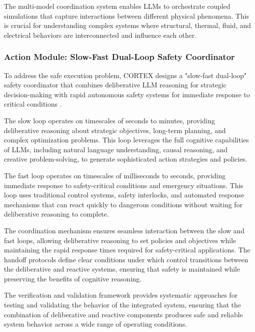 The multi-model coordination system enables LLMs to orchestrate coupled simulations that capture interactions between different physical phenomena. This is crucial for understanding complex systems where structural, thermal, fluid, and electrical behaviors are interconnected and influence each other.

\subsubsection{Action Module: Slow-Fast Dual-Loop Safety Coordinator}

To address the safe execution problem, CORTEX designs a "slow-fast dual-loop" safety coordinator that combines deliberative LLM reasoning for strategic decision-making with rapid autonomous safety systems for immediate response to critical conditions \cite{leveson2011engineering, knight2002safety}.

The slow loop operates on timescales of seconds to minutes, providing deliberative reasoning about strategic objectives, long-term planning, and complex optimization problems. This loop leverages the full cognitive capabilities of LLMs, including natural language understanding, causal reasoning, and creative problem-solving, to generate sophisticated action strategies and policies.

The fast loop operates on timescales of milliseconds to seconds, providing immediate response to safety-critical conditions and emergency situations. This loop uses traditional control systems, safety interlocks, and automated response mechanisms that can react quickly to dangerous conditions without waiting for deliberative reasoning to complete.

The coordination mechanism ensures seamless interaction between the slow and fast loops, allowing deliberative reasoning to set policies and objectives while maintaining the rapid response times required for safety-critical applications. The handoff protocols define clear conditions under which control transitions between the deliberative and reactive systems, ensuring that safety is maintained while preserving the benefits of cognitive reasoning.

The verification and validation framework provides systematic approaches for testing and validating the behavior of the integrated system, ensuring that the combination of deliberative and reactive components produces safe and reliable system behavior across a wide range of operating conditions.

